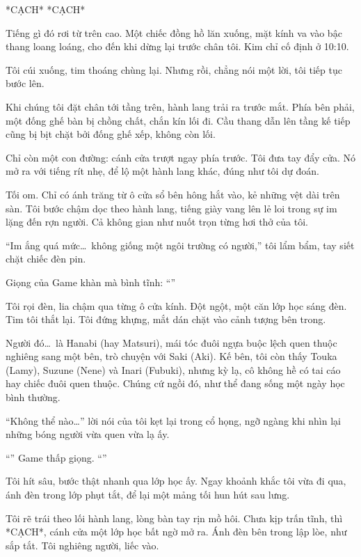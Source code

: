 \documentclass[../main.tex]{subfiles}
\begin{document}
*CẠCH* *CẠCH*

Tiếng gì đó rơi từ trên cao. Một chiếc đồng hồ lăn xuống, mặt kính va vào bậc thang loang loáng, cho đến khi dừng lại trước chân tôi. Kim chỉ cố định ở 10:10.

Tôi cúi xuống, tim thoáng chùng lại. Nhưng rồi, chẳng nói một lời, tôi tiếp tục bước lên.

Khi chúng tôi đặt chân tới tầng trên, hành lang trải ra trước mắt. Phía bên phải, một đống ghế bàn bị chồng chất, chắn kín lối đi. Cầu thang dẫn lên tầng kế tiếp cũng bị bịt chặt bởi đống ghế xếp, không còn lối.

Chỉ còn một con đường: cánh cửa trượt ngay phía trước. Tôi đưa tay đẩy cửa. Nó mở ra với tiếng rít nhẹ, để lộ một hành lang khác, đúng như tôi dự đoán.

Tối om. Chỉ có ánh trăng từ ô cửa sổ bên hông hắt vào, kẻ những vệt dài trên sàn. Tôi bước chậm dọc theo hành lang, tiếng giày vang lên lẻ loi trong sự im lặng đến rợn người. Cả không gian như nuốt trọn từng hơi thở của tôi.

``Im ắng quá mức\dots\ không giống một ngôi trường có người,'' tôi lẩm bẩm, tay siết chặt chiếc đèn pin.

Giọng của Game khàn mà bình tĩnh: ``''

Tôi rọi đèn, lia chậm qua từng ô cửa kính. Đột ngột, một căn lớp học sáng đèn. Tim tôi thắt lại. Tôi đứng khựng, mắt dán chặt vào cảnh tượng bên trong.

Người đó\dots\ là Hanabi (hay Matsuri), mái tóc đuôi ngựa buộc lệch quen thuộc nghiêng sang một bên, trò chuyện với Saki (Aki). Kế bên, tôi còn thấy Touka (Lamy), Suzune (Nene) và Inari (Fubuki), nhưng kỳ lạ, cô không hề có tai cáo hay chiếc đuôi quen thuộc. Chúng cứ ngồi đó, như thể đang sống một ngày học bình thường.

``Không thể nào\dots'' lời nói của tôi kẹt lại trong cổ họng, ngỡ ngàng khi nhìn lại những bóng người vừa quen vừa lạ ấy.

``'' Game thấp giọng. ``''

Tôi hít sâu, bước thật nhanh qua lớp học ấy. Ngay khoảnh khắc tôi vừa đi qua, ánh đèn trong lớp phụt tắt, để lại một mảng tối hun hút sau lưng.

Tôi rẽ trái theo lối hành lang, lòng bàn tay rịn mồ hôi. Chưa kịp trấn tĩnh, thì *CẠCH*, cánh cửa một lớp học bất ngờ mở ra. Ánh đèn bên trong lập lòe, như sắp tắt. Tôi nghiêng người, liếc vào.
\end{document}
